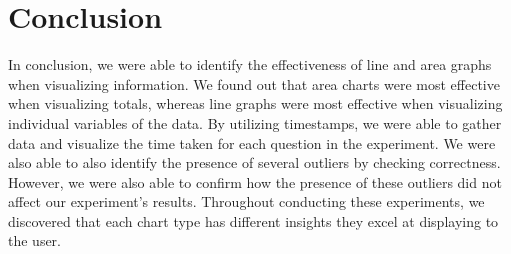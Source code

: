 \section{Conclusion}
\quad In conclusion, we were able to identify the effectiveness of line and area graphs when visualizing information. We found out that area charts were most effective when visualizing totals, whereas line graphs were most effective when visualizing individual variables of the data. By utilizing timestamps, we were able to gather data and visualize the time taken for each question in the experiment. We were also able to also identify the presence of several outliers by checking correctness. However, we were also able to confirm how the presence of these outliers did not affect our experiment's results. Throughout conducting these experiments, we discovered that each chart type has different insights they excel at displaying to the user.